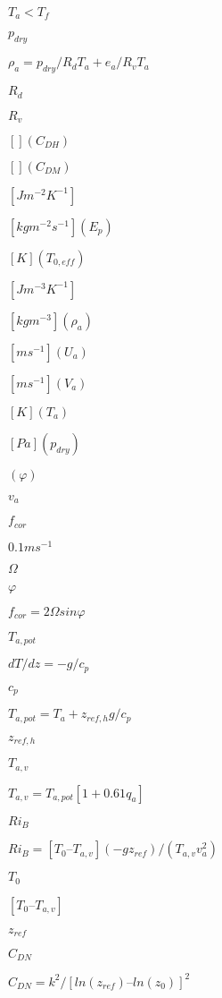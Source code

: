 \documentclass{article}
\begin{document}
$T_a < T_f$
\pagebreak

$p_{dry}$
\pagebreak

$\rho_a = p_{dry} / R_d T_a + e_a / R_v T_a$
\pagebreak

$R_d$
\pagebreak

$R_v$
\pagebreak

$[ ] (C_{DH} )$
\pagebreak

$[ ] (C_{DM} )$
\pagebreak

$[J m^{-2} K^{-1} ]$
\pagebreak

$[kg m^{-2} s^{-1} ] (E_p )$
\pagebreak

$[K] (T_{0,eff} )$
\pagebreak

$[J m^{-3} K^{-1} ]$
\pagebreak

$[kg m^{-3} ] (\rho_a )$
\pagebreak

$[m s^{-1} ] (U_a )$
\pagebreak

$[m s^{-1} ] (V_a )$
\pagebreak

$[K] (T_a )$
\pagebreak

$[Pa] (p_{dry} )$
\pagebreak

$(\varphi)$
\pagebreak

$v_a$
\pagebreak

$f_{cor}$
\pagebreak

$0.1 m s^{-1}$
\pagebreak

$\Omega$
\pagebreak

$\varphi$
\pagebreak

$f_{cor} = 2 \Omega sin \varphi$
\pagebreak

$T_{a,pot}$
\pagebreak

$dT/dz = -g/c_p$
\pagebreak

$c_p$
\pagebreak

$T_{a,pot} = T_a + z_{ref,h} g/c_p$
\pagebreak

$z_{ref,h}$
\pagebreak

$T_{a,v}$
\pagebreak

$T_{a,v} = T_{a,pot} [1 + 0.61 q_a ]$
\pagebreak

$Ri_B$
\pagebreak

$Ri_B = [T_0 – T_{a,v} ] (-g z_{ref} )/(T_{a,v} v_a^2 )$
\pagebreak

$T_0$
\pagebreak

$[T_0 – T_{a,v} ]$
\pagebreak

$z_{ref}$
\pagebreak

$C_{DN}$
\pagebreak

$C_{DN} = k^2 /[ln(z_{ref} ) – ln(z_0 )]^2$
\pagebreak
\end{document}
